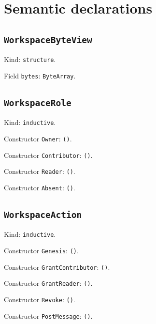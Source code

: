 \documentclass[11pt]{article}
\begin{document}
\section*{Semantic declarations}
\subsection*{\texttt{WorkspaceByteView}}
\noindent Kind: \texttt{structure}.\par
\noindent Field \texttt{bytes}: \texttt{ByteArray}.\par
\subsection*{\texttt{WorkspaceRole}}
\noindent Kind: \texttt{inductive}.\par
\noindent Constructor \texttt{Owner}: \texttt{()}.\par
\noindent Constructor \texttt{Contributor}: \texttt{()}.\par
\noindent Constructor \texttt{Reader}: \texttt{()}.\par
\noindent Constructor \texttt{Absent}: \texttt{()}.\par
\subsection*{\texttt{WorkspaceAction}}
\noindent Kind: \texttt{inductive}.\par
\noindent Constructor \texttt{Genesis}: \texttt{()}.\par
\noindent Constructor \texttt{GrantContributor}: \texttt{()}.\par
\noindent Constructor \texttt{GrantReader}: \texttt{()}.\par
\noindent Constructor \texttt{Revoke}: \texttt{()}.\par
\noindent Constructor \texttt{PostMessage}: \texttt{()}.\par
\end{document}
